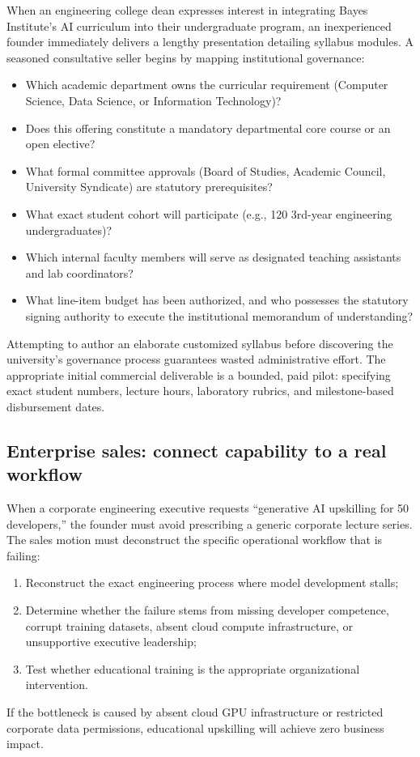 When an engineering college dean expresses interest in integrating Bayes Institute's AI curriculum into their undergraduate program, an inexperienced founder immediately delivers a lengthy presentation detailing syllabus modules. A seasoned consultative seller begins by mapping institutional governance:
\begin{itemize}
\item Which academic department owns the curricular requirement (Computer Science, Data Science, or Information Technology)?
\item Does this offering constitute a mandatory departmental core course or an open elective?
\item What formal committee approvals (Board of Studies, Academic Council, University Syndicate) are statutory prerequisites?
\item What exact student cohort will participate (e.g., 120 3rd-year engineering undergraduates)?
\item Which internal faculty members will serve as designated teaching assistants and lab coordinators?
\item What line-item budget has been authorized, and who possesses the statutory signing authority to execute the institutional memorandum of understanding?
\end{itemize}
Attempting to author an elaborate customized syllabus before discovering the university's governance process guarantees wasted administrative effort. The appropriate initial commercial deliverable is a bounded, paid pilot: specifying exact student numbers, lecture hours, laboratory rubrics, and milestone-based disbursement dates.

\subsection{Enterprise sales: connect capability to a real workflow}

When a corporate engineering executive requests ``generative AI upskilling for 50 developers,'' the founder must avoid prescribing a generic corporate lecture series. The sales motion must deconstruct the specific operational workflow that is failing:
\begin{enumerate}
\item Reconstruct the exact engineering process where model development stalls;
\item Determine whether the failure stems from missing developer competence, corrupt training datasets, absent cloud compute infrastructure, or unsupportive executive leadership;
\item Test whether educational training is the appropriate organizational intervention.
\end{enumerate}
If the bottleneck is caused by absent cloud GPU infrastructure or restricted corporate data permissions, educational upskilling will achieve zero business impact.

